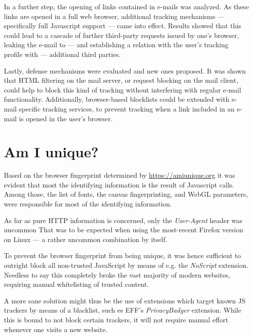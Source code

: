 \documentclass[a4paper]{scrreprt}
\begin{document}
In a further step, the opening of links contained in e-mails was analyzed. As
these links are opened in a full web browser, additional tracking mechanisms
--- specifically full Javascript support --- came into effect.  Results showed
that this could lead to a cascade of further third-party requests issued by
one's browser, leaking the e-mail to --- and establishing a relation with the
user's tracking profile with --- additional third parties.

Lastly, defense mechanisms were evaluated and new ones proposed. It was shown
that HTML filtering on the mail server, or request blocking on the mail client,
could help to block this kind of tracking without interfering with regular
e-mail functionality. Additionally, browser-based blocklists could be extended
with e-mail specific tracking services, to prevent tracking when a link
included in an e-mail is opened in the user's browser.

\section{Am I unique?}

Based on the browser fingerprint determined by
\href{https://amiunique.org}{https://amiunique.org} it was evident that most
the identifying information is the result of Javascript calls.  Among those,
the list of fonts, the canvas fingerprinting, and WebGL parameters, were
responsible for most of the identifying information.

As far as pure HTTP information is concerned, only the \emph{User-Agent} header
was uncommon That was to be expected when using the most-recent Firefox
version on Linux --- a rather uncommon combination by itself.

To prevent the browser fingerprint from being unique, it was hence sufficient
to outright block all non-trusted JavaScript by means of e.g. the
\emph{NoScript} extension. Needless to say this completely broke the vast
majority of modern websites, requiring manual whitelisting of trusted content.

A more sane solution might thus be the use of extensions which target known JS
trackers by means of a blacklist, such es EFF's \emph{PrivacyBadger} extension.
While this is bound to not block certain trackers, it will not require manual
effort whenever one visits a new website.

\printbibliography
\end{document}

